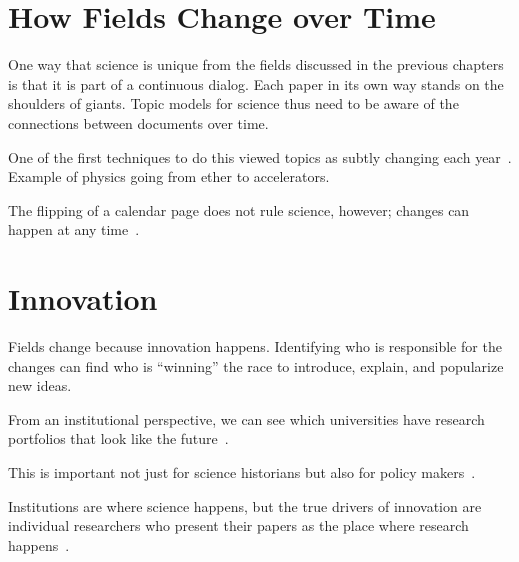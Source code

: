 \section{How Fields Change over Time}
\label{sec:science_fields}

One way that science is unique from the fields discussed in the
previous chapters is that it is part of a continuous dialog.  Each
paper in its own way stands on the shoulders of giants. Topic models
for science thus need to be aware of the connections between documents
over time.

One of the first techniques to do this viewed topics as subtly
changing each year~\citep{blei-06b}.  Example of physics going from
ether to accelerators.

The flipping of a calendar page does not rule science, however;
changes can happen at any time~\citep{wang-06,wang-08}.

\section{Innovation}

Fields change because innovation happens.  Identifying who is
responsible for the changes can find who is ``winning'' the race to
introduce, explain, and popularize new ideas.

From an institutional perspective, we can see which universities have
research portfolios that look like the future~\citep{ramage-10}.

This is important not just for science historians but also for policy
makers~\citep{largent-12}.

Institutions are where science happens, but the true drivers of
innovation are individual researchers who present their papers as the
place where research happens~\citep{gerrish-10}.
